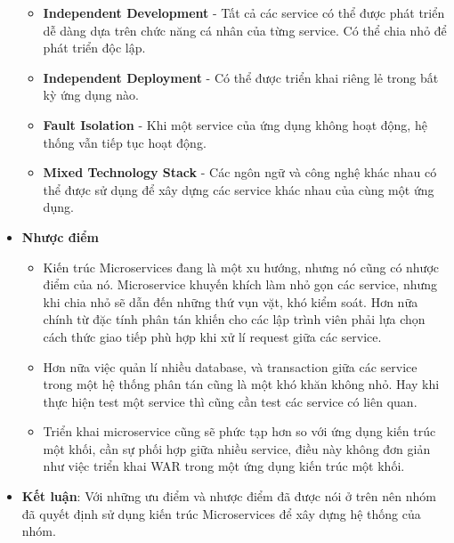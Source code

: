 \begin{itemize}
\begin{itemize}
                \item \textbf{Independent Development} - Tất cả các service có thể được phát triển dễ dàng dựa trên chức năng cá nhân của từng service. Có thể chia nhỏ để phát triển độc lập.
                \item \textbf{Independent Deployment} - Có thể được triển khai riêng lẻ trong bất kỳ ứng dụng nào.
                \item \textbf{Fault Isolation} - Khi một service của ứng dụng không hoạt động, hệ thống vẫn tiếp tục hoạt động.
                \item \textbf{Mixed Technology Stack} - Các ngôn ngữ và công nghệ khác nhau có thể được sử dụng để xây dựng các service khác nhau của cùng một ứng dụng.
            \end{itemize}
            \item \textbf{Nhược điểm}
            \begin{itemize}
                \item Kiến trúc Microservices đang là một xu hướng, nhưng nó cũng có nhược điểm của nó. Microservice khuyến khích làm nhỏ gọn các service, nhưng khi chia nhỏ sẽ dẫn đến những thứ vụn vặt, khó kiểm soát. Hơn nữa chính từ đặc tính phân tán khiến cho các lập trình viên phải lựa chọn cách thức giao tiếp phù hợp khi xử lí request giữa các service.
                \item Hơn nữa việc quản lí nhiều database, và transaction giữa các service trong một hệ thống phân tán cũng là một khó khăn không nhỏ. Hay khi thực hiện test một service thì cũng cần test các service có liên quan.
                \item Triển khai microservice cũng sẽ phức tạp hơn so với ứng dụng kiến trúc một khối, cần sự phối hợp giữa nhiều service, điều này không đơn giản như việc triển khai WAR trong một ứng dụng kiến trúc một khối.
            \end{itemize}
            \item \textbf{Kết luận}: Với những ưu điểm và nhược điểm đã được nói ở trên nên nhóm đã quyết định sử dụng kiến trúc Microservices để xây dựng hệ thống của nhóm.
        \end{itemize}

